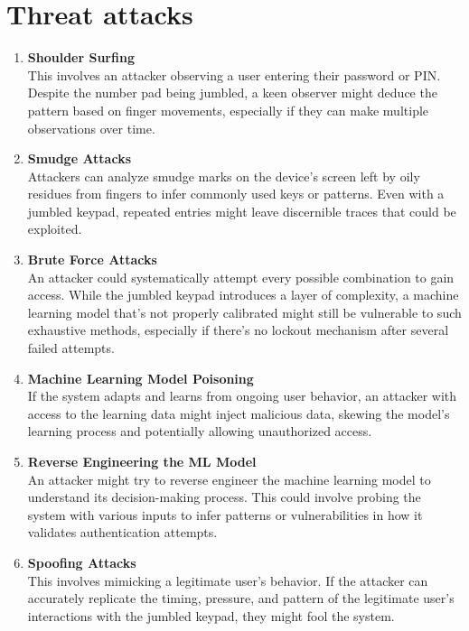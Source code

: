 \documentclass{article}
\begin{document}
\section*{Threat attacks}

\begin{enumerate}[label=\arabic*.]
    \item \textbf{Shoulder Surfing} \\
    This involves an attacker observing a user entering their password or PIN. Despite the number pad being jumbled, a keen observer might deduce the pattern based on finger movements, especially if they can make multiple observations over time.
    
    \item \textbf{Smudge Attacks} \\
    Attackers can analyze smudge marks on the device's screen left by oily residues from fingers to infer commonly used keys or patterns. Even with a jumbled keypad, repeated entries might leave discernible traces that could be exploited.
    
    \item \textbf{Brute Force Attacks} \\
    An attacker could systematically attempt every possible combination to gain access. While the jumbled keypad introduces a layer of complexity, a machine learning model that’s not properly calibrated might still be vulnerable to such exhaustive methods, especially if there's no lockout mechanism after several failed attempts.
    
    \item \textbf{Machine Learning Model Poisoning} \\
    If the system adapts and learns from ongoing user behavior, an attacker with access to the learning data might inject malicious data, skewing the model's learning process and potentially allowing unauthorized access.
    
    \item \textbf{Reverse Engineering the ML Model} \\
    An attacker might try to reverse engineer the machine learning model to understand its decision-making process. This could involve probing the system with various inputs to infer patterns or vulnerabilities in how it validates authentication attempts.
    
    \item \textbf{Spoofing Attacks} \\
    This involves mimicking a legitimate user's behavior. If the attacker can accurately replicate the timing, pressure, and pattern of the legitimate user's interactions with the jumbled keypad, they might fool the system.
    

\end{enumerate}
\end{document}
